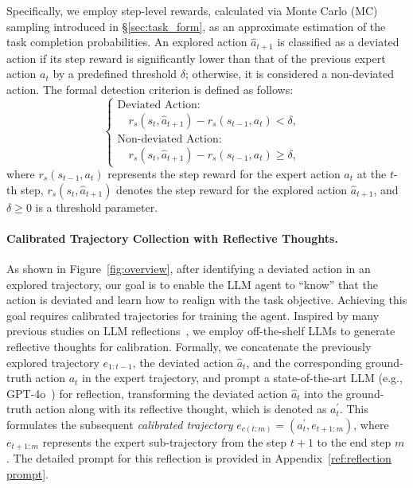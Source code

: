 Specifically, we employ step-level rewards, calculated via Monte Carlo (MC) sampling introduced in \S\ref{sec:task_form}, as an approximate estimation of the task completion probabilities.
An explored action $\hat{a}_{t+1}$ is classified as a deviated action if its step reward is significantly lower than that of the previous expert action $a_t$ by a predefined threshold $\delta$; otherwise, it is considered a non-deviated action.
The formal detection criterion is defined as follows:
\begin{equation}
    \begin{cases}
    \text{Deviated Action:} & \\
    \quad r_s(s_{t}, \hat{a}_{t+1}) - r_s(s_{t-1}, a_{t}) < \delta, \\
    \text{Non-deviated Action:} & \\
    \quad r_s(s_{t}, \hat{a}_{t+1}) - r_s(s_{t-1}, a_{t})\geq \delta,
    \end{cases}
\end{equation}
where $r_s(s_{t-1}, a_{t})$ represents the step reward for the expert action $a_{t}$ at the $t$-th step, $r_s(s_{t},\hat{a}_{t+1})$ denotes the step reward for the explored action $\hat{a}_{t+1}$, and $\delta \geq 0$ is a threshold parameter.


\paragraph{Calibrated Trajectory Collection with Reflective Thoughts.}
As shown in Figure~\ref{fig:overview}, after identifying a deviated action in an explored trajectory, our goal is to enable the LLM agent to ``know'' that the action is deviated and learn how to realign with the task objective. Achieving this goal requires calibrated trajectories for training the agent. Inspired by many previous studies on LLM reflections~\citep{shinn2023reflexion}, we employ off-the-shelf  LLMs to generate reflective thoughts for calibration. Formally, we concatenate the previously explored trajectory $e_{1:t-1}$, the deviated action $\hat{a}_t$, and the corresponding ground-truth action $a_t$ in the expert trajectory, and prompt a state-of-the-art LLM (e.g., GPT-4o~\citep{openai2024gpt4o}) for reflection, transforming the deviated action $\hat{a}_t$ into the ground-truth action along with its reflective thought, which is denoted as $a_t^{'}$. This formulates the subsequent \textit{calibrated trajectory} $e_{c(t:m)} = (a_t^{'}, e_{t+1:m})$, where $e_{t+1:m}$ represents the expert sub-trajectory from the step $t+1$ to the end step $m$. The detailed prompt for this reflection is provided in Appendix~\ref{ref:reflection prompt}. 

